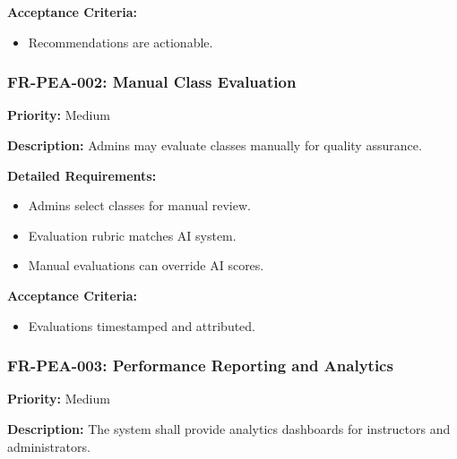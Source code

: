 \textbf{Acceptance Criteria:}
\begin{itemize}
    \item Recommendations are actionable.
\end{itemize}

\subsubsection{FR-PEA-002: Manual Class Evaluation}
\textbf{Priority:} Medium  

\textbf{Description:} Admins may evaluate classes manually for quality assurance.

\textbf{Detailed Requirements:}
\begin{itemize}
    \item Admins select classes for manual review.
    \item Evaluation rubric matches AI system.
    \item Manual evaluations can override AI scores.
\end{itemize}

\textbf{Acceptance Criteria:}
\begin{itemize}
    \item Evaluations timestamped and attributed.
\end{itemize}

\subsubsection{FR-PEA-003: Performance Reporting and Analytics}
\textbf{Priority:} Medium  

\textbf{Description:} The system shall provide analytics dashboards for instructors and administrators.

